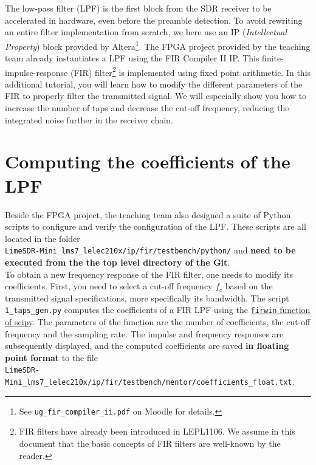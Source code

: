

The low-pass filter (LPF) is the first block from the SDR receiver to be accelerated in hardware, even before the preamble detection. To avoid rewriting an entire filter implementation from scratch, we here use an IP (\textit{Intellectual Property}) block provided by Altera\footnote{See \texttt{ug\_fir\_compiler\_ii.pdf} on Moodle for details.}. The FPGA project provided by the teaching team already instantiates a LPF using the FIR Compiler II IP. This finite-impulse-response (FIR) filter\footnote{FIR filters
have already been introduced in LEPL1106. We assume in this document that the basic concepts of FIR filters are well-known by the reader.} is implemented using fixed point arithmetic. In this additional tutorial, you will learn how to modify the different parameters of the FIR to properly filter the transmitted signal. We will especially show you how to increase the number of taps and decrease the cut-off frequency, reducing the integrated noise further in the receiver chain.

\section{Computing the coefficients of the LPF}

Beside the FPGA project, the teaching team also designed a suite of Python scripts to configure and verify the configuration of the LPF. These scripts are all located in the folder \\ \texttt{LimeSDR-Mini\_lms7\_lelec210x/ip/fir/testbench/python/} and \textbf{need to be executed from the the top level directory of the Git}. \\

To obtain a new frequency response of the FIR filter, one needs to modify its coefficients. First, you need to select a cut-off frequency $f_c$ based on the transmitted signal specifications, more specifically its bandwidth.
The script \texttt{1\_taps\_gen.py} computes the coefficients of a FIR LPF using the \href{https://docs.scipy.org/doc/scipy/reference/generated/scipy.signal.firwin.html}{\texttt{firwin} function of scipy}. The parameters of the function are the number of coefficients, the cut-off frequency and the sampling rate. The impulse and frequency responses are subsequently displayed, and the computed coefficients are saved \textbf{in floating point format} to the file \\ \texttt{LimeSDR-Mini\_lms7\_lelec210x/ip/fir/testbench/mentor/coefficients\_float.txt}. \\

